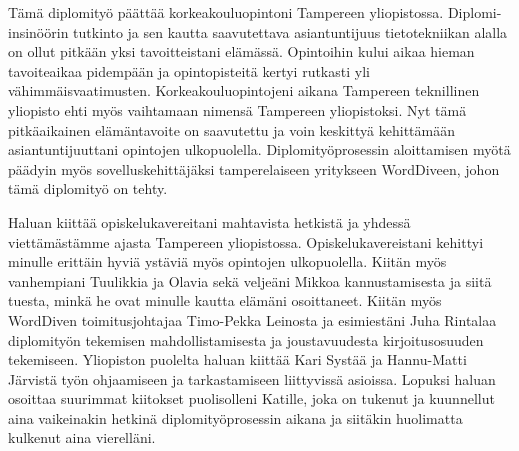 Tämä diplomityö päättää korkeakouluopintoni Tampereen yliopistossa.
Diplomi-insinöörin tutkinto ja sen kautta saavutettava asiantuntijuus tietotekniikan alalla on ollut pitkään yksi tavoitteistani elämässä.
Opintoihin kului aikaa hieman tavoiteaikaa pidempään ja opintopisteitä kertyi rutkasti yli vähimmäisvaatimusten.
Korkeakouluopintojeni aikana Tampereen teknillinen yliopisto ehti myös vaihtamaan nimensä Tampereen yliopistoksi.
Nyt tämä pitkäaikainen elämäntavoite on saavutettu ja voin keskittyä kehittämään asiantuntijuuttani opintojen ulkopuolella.
Diplomityöprosessin aloittamisen myötä päädyin myös sovelluskehittäjäksi tamperelaiseen yritykseen WordDiveen, johon tämä diplomityö on tehty.

Haluan kiittää opiskelukavereitani mahtavista hetkistä ja yhdessä viettämästämme ajasta Tampereen yliopistossa.
Opiskelukavereistani kehittyi minulle erittäin hyviä ystäviä myös opintojen ulkopuolella.
Kiitän myös vanhempiani Tuulikkia ja Olavia sekä veljeäni Mikkoa kannustamisesta ja siitä tuesta, minkä he ovat minulle kautta elämäni osoittaneet.
Kiitän myös WordDiven toimitusjohtajaa Timo-Pekka Leinosta ja esimiestäni Juha Rintalaa diplomityön tekemisen mahdollistamisesta ja joustavuudesta kirjoitusosuuden tekemiseen.
Yliopiston puolelta haluan kiittää Kari Systää ja Hannu-Matti Järvistä työn ohjaamiseen ja tarkastamiseen liittyvissä asioissa.
Lopuksi haluan osoittaa suurimmat kiitokset puolisolleni Katille, joka on tukenut ja kuunnellut aina vaikeinakin hetkinä diplomityöprosessin aikana ja siitäkin huolimatta kulkenut aina vierelläni.
